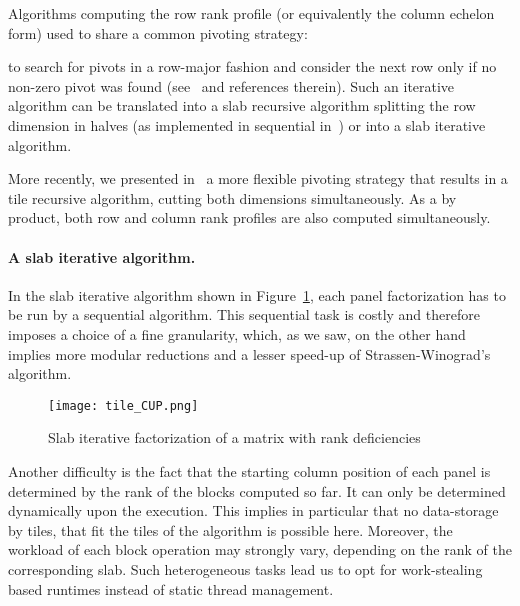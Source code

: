\documentclass{article}
\begin{document}
 
Algorithms computing the row rank profile (or equivalently the column
echelon form) used to share a common pivoting strategy:
 
to search for pivots in a row-major fashion and consider the next row only if no
non-zero pivot was found (see~\cite{JPS13} and references therein).
Such an iterative algorithm can be translated into a slab recursive algorithm
splitting the row dimension in halves (as implemented in sequential
in~\cite{DGP08}) or into a slab iterative algorithm.
 
 
 
 
 
 
 
 
 
 
 
 
 
More recently, we presented in~\cite{DPS13} a more flexible pivoting strategy
that results in a tile recursive algorithm, cutting both dimensions
simultaneously. As a by product, both row and column rank profiles are
also computed simultaneously.
 
 
 

 
 

 
 
\vspace{-1em}
\paragraph{A slab iterative algorithm.}
 
 
 
 
 
 
In the slab iterative algorithm shown in Figure~\ref{fig:TileCUP}, each panel factorization has to be run by a
sequential algorithm. This sequential task is costly and therefore imposes a
choice of a fine granularity, which, as we saw, on the other hand implies more
modular reductions and a lesser speed-up of Strassen-Winograd's algorithm.
\begin{figure}[ht!]
\centering
\texttt{[image: tile\_CUP.png]}
 
 
\caption{Slab iterative factorization of a matrix with rank deficiencies}
\label{fig:TileCUP}
\end{figure}

Another difficulty is the fact that the starting column position of
each panel is determined by the rank of the blocks computed so far.
It can only be determined dynamically upon the execution.
This implies in particular that no data-storage by tiles, that fit the
tiles of the algorithm is possible here. 
Moreover, the workload of each block operation may strongly vary,
depending on the rank of the corresponding slab. Such heterogeneous
tasks lead us to opt for work-stealing based runtimes instead of
static thread management. 
 
\end{document}
